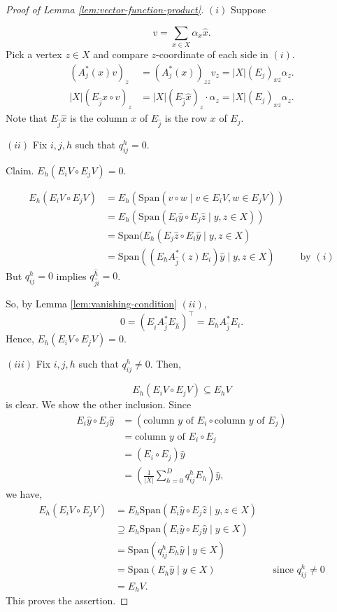 \documentclass[
]{book}
\theoremstyle{definition}
\theoremstyle{definition}
\theoremstyle{definition}
\theoremstyle{definition}
\theoremstyle{remark}
\begin{document}
\begin{proof}[Proof of Lemma \ref{lem:vector-function-product}]
\leavevmode

\((i)\) Suppose

\[v = \sum_{x\in X}\alpha_x \hat{x}.\]
Pick a vertex \(z\in X\) and compare \(z\)-coordinate of each side in \((i)\).
\begin{align}
(A^*_j(x)v)_z & = (A^*_j(x))_{zz}v_z = |X|(E_j)_{xz}\alpha_z.\\
|X|(E_{\hat{j}}\hat{x}\circ v)_z & = |X|(E_{\hat{j}}\hat{x})_z\cdot \alpha_z  = |X|(E_j)_{xz}\alpha_z.
\end{align}
Note that \(E_{\hat{j}}\hat{x}\) is the column \(x\) of \(E_{\hat{j}}\) is the row \(x\) of \(E_j\).

\((ii)\) Fix \(i, j, h\) such that \(q^h_{ij} = 0\).

Claim. \(E_h(E_iV \circ E_jV) = 0\).

\begin{align}
E_h(E_iV \circ E_jV) & = E_h(\mathrm{Span}(v\circ w\mid v\in E_iV, w\in E_jV))\\
& = E_h(\mathrm{Span}(E_i\hat{y}\circ E_j\hat{z}\mid y,z\in X))\\
& = \mathrm{Span}(E_h(E_j\hat{z}\circ E_i\hat{y}\mid y,z\in X)\\
& = \mathrm{Span}((E_hA^*_{\hat{j}}(z)E_i)\hat{y}\mid y,z\in X) && \text{by $(i)$}
\end{align}
But \(q^h_{ij} = 0\) implies \(q^{\hat{h}}_{\hat{j}\hat{i}} = 0\).

So, by Lemma \ref{lem:vanishing-condition} \((ii)\),
\[ 0 = (E_{\hat{i}}A^*_{\hat{j}}E_{\hat{h}})^\top = E_h A^*_{\hat{j}}E_i.\]
Hence, \(E_h(E_iV\circ E_jV) = 0\).

\((iii)\) Fix \(i, j, h\) such that \(q^h_{ij}\neq 0\). Then,

\[E_h(E_iV \circ E_jV)\subseteq E_hV\]
is clear. We show the other inclusion. Since
\begin{align}
E_i\hat{y} \circ E_j\hat{y} &=  (\text{column $y$ of $E_i$}\circ \text{column $y$ of $E_j$}) \\
&  = \text{column $y$ of $E_i\circ E_j$}\\
&  = (E_i\circ E_j)\hat{y}\\
&  = \left(\frac{1}{|X|}\sum_{h=0}^D q^h_{ij}E_h\right)\hat{y},
\end{align}
we have,
\begin{align}
E_h(E_iV\circ E_jV) & = E_h\mathrm{Span}(E_i\hat{y}\circ E_j\hat{z}\mid y,z\in X)\\
& \supseteq E_h \mathrm{Span}(E_i\hat{y}\circ E_j\hat{y}\mid y\in X)\\
& = \mathrm{Span}(q^h_{ij}E_h\hat{y}\mid y\in X)\\
& = \mathrm{Span}(E_h\hat{y}\mid y\in X) && \text{since $q^h_{ij}\neq 0$}\\
& = E_hV.
\end{align}
This proves the assertion.

\end{proof}
\end{document}
